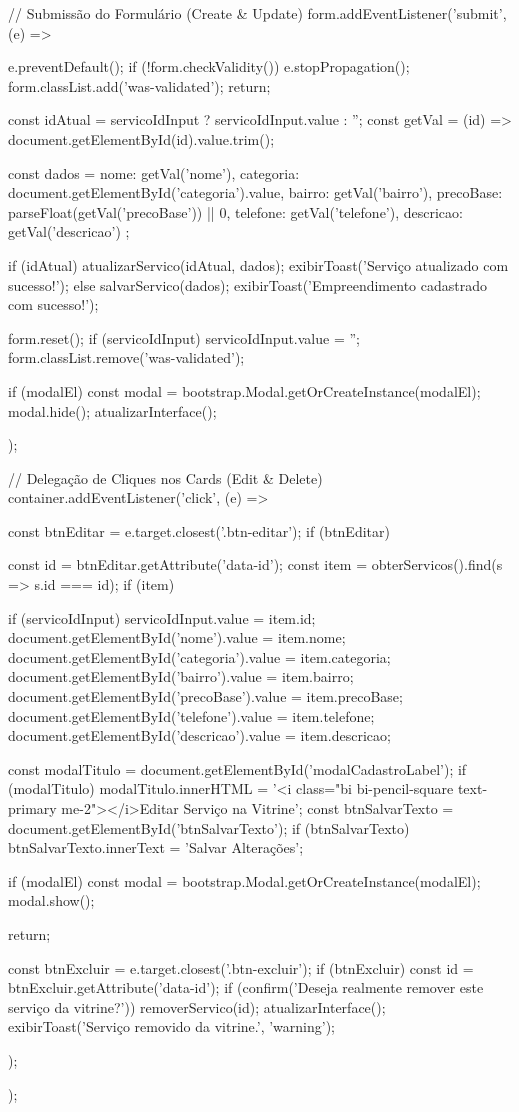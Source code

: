 \begin{boxCodigoJS}[js/main.js]
{  // Submissão do Formulário (Create & Update)
  form.addEventListener('submit', (e) => {
    e.preventDefault();
    if (!form.checkValidity()) {
      e.stopPropagation();
      form.classList.add('was-validated');
      return;
    }

    const idAtual = servicoIdInput ? servicoIdInput.value : '';
    const getVal = (id) => document.getElementById(id).value.trim();

    const dados = {
      nome: getVal('nome'),
      categoria: document.getElementById('categoria').value,
      bairro: getVal('bairro'),
      precoBase: parseFloat(getVal('precoBase')) || 0,
      telefone: getVal('telefone'),
      descricao: getVal('descricao')
    };

    if (idAtual) {
      atualizarServico(idAtual, dados);
      exibirToast('Serviço atualizado com sucesso!');
    } else {
      salvarServico(dados);
      exibirToast('Empreendimento cadastrado com sucesso!');
    }

    form.reset();
    if (servicoIdInput) servicoIdInput.value = '';
    form.classList.remove('was-validated');

    if (modalEl) {
      const modal = bootstrap.Modal.getOrCreateInstance(modalEl);
      modal.hide();
    }
    atualizarInterface();
  });

  // Delegação de Cliques nos Cards (Edit & Delete)
  container.addEventListener('click', (e) => {
    const btnEditar = e.target.closest('.btn-editar');
    if (btnEditar) {
      const id = btnEditar.getAttribute('data-id');
      const item = obterServicos().find(s => s.id === id);
      if (item) {
        if (servicoIdInput) servicoIdInput.value = item.id;
        document.getElementById('nome').value = item.nome;
        document.getElementById('categoria').value = item.categoria;
        document.getElementById('bairro').value = item.bairro;
        document.getElementById('precoBase').value = item.precoBase;
        document.getElementById('telefone').value = item.telefone;
        document.getElementById('descricao').value = item.descricao;

        const modalTitulo = document.getElementById('modalCadastroLabel');
        if (modalTitulo) {
          modalTitulo.innerHTML =
            '<i class="bi bi-pencil-square text-primary me-2"></i>Editar Serviço na Vitrine';
        }
        const btnSalvarTexto = document.getElementById('btnSalvarTexto');
        if (btnSalvarTexto) {
          btnSalvarTexto.innerText = 'Salvar Alterações';
        }

        if (modalEl) {
          const modal = bootstrap.Modal.getOrCreateInstance(modalEl);
          modal.show();
        }
      }
      return;
    }

    const btnExcluir = e.target.closest('.btn-excluir');
    if (btnExcluir) {
      const id = btnExcluir.getAttribute('data-id');
      if (confirm('Deseja realmente remover este serviço da vitrine?')) {
        removerServico(id);
        atualizarInterface();
        exibirToast('Serviço removido da vitrine.', 'warning');
      }
    }
  });
});
\end{boxCodigoJS}

